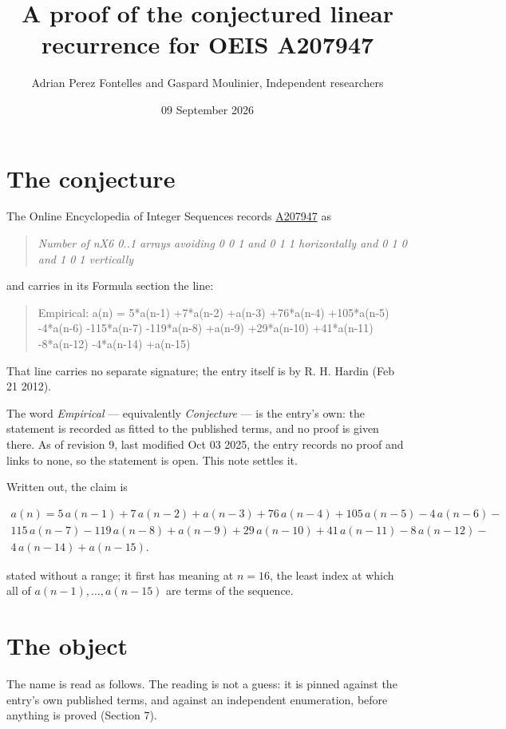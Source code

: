 \documentclass[11pt]{article}
\title{A proof of the conjectured linear recurrence for OEIS A207947}
\author{Adrian Perez Fontelles and Gaspard Moulinier, Independent researchers}
\date{09 September 2026}
\theoremstyle{definition}
\begin{document}
\maketitle
\section{The conjecture}

The Online Encyclopedia of Integer Sequences records \href{https://oeis.org/A207947}{A207947} as

\begin{quote}\itshape Number of nX6 0..1 arrays avoiding 0 0 1 and 0 1 1 horizontally and 0 1 0 and 1 0 1 vertically\end{quote}

and carries in its Formula section the line:

\begin{quote}\ttfamily Empirical: a(n) = 5*a(n-1) +7*a(n-2) +a(n-3) +76*a(n-4) +105*a(n-5) -4*a(n-6) -115*a(n-7) -119*a(n-8) +a(n-9) +29*a(n-10) +41*a(n-11) -8*a(n-12) -4*a(n-14) +a(n-15)\end{quote}

That line carries no separate signature; the entry itself is by R. H. Hardin (Feb 21 2012).

The word {\itshape Empirical} --- equivalently {\itshape Conjecture} --- is the entry's own: the statement is recorded as fitted to the published terms, and no proof is given there. As of revision 9, last modified Oct 03 2025, the entry records no proof and links to none, so the statement is open. This note settles it.

Written out, the claim is

\begin{multline*} a(n) = 5\,a(n-1) + 7\,a(n-2) + a(n-3) + 76\,a(n-4) + 105\,a(n-5) - 4\,a(n-6) - \\ 115\,a(n-7) - 119\,a(n-8) + a(n-9) + 29\,a(n-10) + 41\,a(n-11) - 8\,a(n-12) - \\ 4\,a(n-14) + a(n-15). \end{multline*}

stated without a range; it first has meaning at $n = 16$, the least index at which all of $a(n-1),\dots,a(n-15)$ are terms of the sequence.

\section{The object}

The name is read as follows. The reading is not a guess: it is pinned against the entry's own published terms, and against an independent enumeration, before anything is proved (Section 7).
\end{document}
